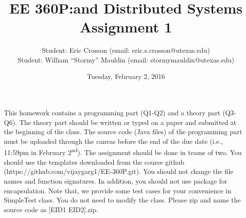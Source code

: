 \documentclass[11pt]{article}
\begin{document}
\title{EE 360P:\@Concurrent and Distributed Systems \\ Assignment 1}
\author{Student: Eric Crosson (email: eric.s.crosson@utexas.edu)\\
  Student: William ``Stormy'' Mauldin (email: stormymauldin@utexas.edu)}
\date{Tuesday, February 2, 2016}
\maketitle

This homework contains a programming part (Q1-Q2) and a theory part (Q3-Q6). The
theory part should be written or typed on a paper and submitted at the beginning
of the class. The source code (Java files) of the programming part must be
uploaded through the canvas before the end of the due date (i.e., 11:59pm in
February 2\textsuperscript{nd}). The assignment should be done in teams of two. You
should use the templates downloaded from the course github
(https://github.com/vijaygarg1/EE-360P.git). You should not change the file
names and function signatures. In addition, you should not use package for
encapsulation. Note that, we provide some test cases for your convenience in
SimpleTest class. You do not need to modify the class. Please zip and name the
source code as [EID1 EID2].zip. \\
\end{document}
